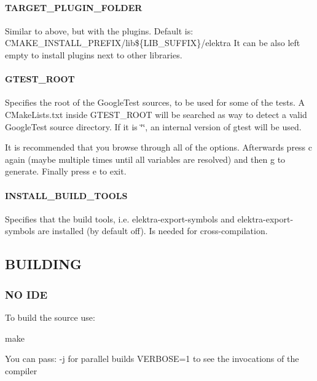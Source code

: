 \paragraph*{T\+A\+R\+G\+E\+T\+\_\+\+P\+L\+U\+G\+I\+N\+\_\+\+F\+O\+L\+D\+E\+R}

Similar to above, but with the plugins. Default is\+: C\+M\+A\+K\+E\+\_\+\+I\+N\+S\+T\+A\+L\+L\+\_\+\+P\+R\+E\+F\+I\+X/lib\$\{L\+I\+B\+\_\+\+S\+U\+F\+F\+I\+X\}/elektra It can be also left empty to install plugins next to other libraries.

\paragraph*{G\+T\+E\+S\+T\+\_\+\+R\+O\+O\+T}

Specifies the root of the Google\+Test sources, to be used for some of the tests. A C\+Make\+Lists.\+txt inside G\+T\+E\+S\+T\+\_\+\+R\+O\+O\+T will be searched as way to detect a valid Google\+Test source directory. If it is \char`\"{}\char`\"{}, an internal version of gtest will be used.

It is recommended that you browse through all of the options. Afterwards press c again (maybe multiple times until all variables are resolved) and then g to generate. Finally press e to exit.

\paragraph*{I\+N\+S\+T\+A\+L\+L\+\_\+\+B\+U\+I\+L\+D\+\_\+\+T\+O\+O\+L\+S}

Specifies that the build tools, i.\+e. {\ttfamily elektra-\/export-\/symbols} and {\ttfamily elektra-\/export-\/symbols} are installed (by default off). Is needed for cross-\/compilation.

\subsection*{B\+U\+I\+L\+D\+I\+N\+G}

\subsubsection*{N\+O I\+D\+E}

To build the source use\+: \begin{DoxyVerb}make
\end{DoxyVerb}


You can pass\+: -\/j for parallel builds V\+E\+R\+B\+O\+S\+E=1 to see the invocations of the compiler

